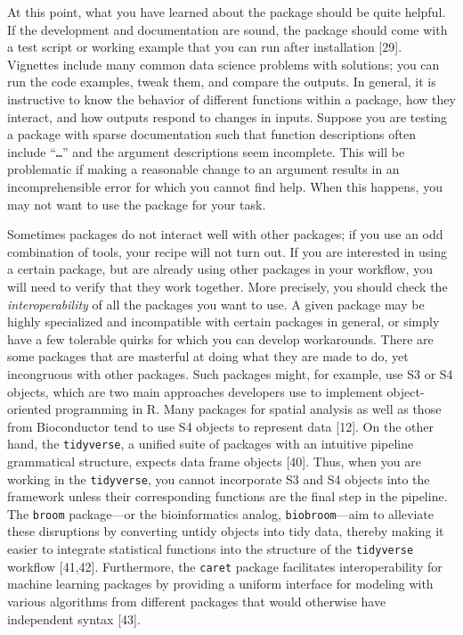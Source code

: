 \documentclass[10pt,letterpaper]{article}
\begin{document}
At this point, what you have learned about the package should be quite
helpful. If the development and documentation are sound, the package
should come with a test script or working example that you can run after
installation {[}29{]}. Vignettes include many common data science
problems with solutions; you can run the code examples, tweak them, and
compare the outputs. In general, it is instructive to know the behavior
of different functions within a package, how they interact, and how
outputs respond to changes in inputs. Suppose you are testing a package
with sparse documentation such that function descriptions often include
``\texttt{\ldots{}}'' and the argument descriptions seem incomplete.
This will be problematic if making a reasonable change to an argument
results in an incomprehensible error for which you cannot find help.
When this happens, you may not want to use the package for your task.

Sometimes packages do not interact well with other packages; if you use
an odd combination of tools, your recipe will not turn out. If you are
interested in using a certain package, but are already using other
packages in your workflow, you will need to verify that they work
together. More precisely, you should check the \emph{interoperability}
of all the packages you want to use. A given package may be highly
specialized and incompatible with certain packages in general, or simply
have a few tolerable quirks for which you can develop workarounds. There
are some packages that are masterful at doing what they are made to do,
yet incongruous with other packages. Such packages might, for example,
use S3 or S4 objects, which are two main approaches developers use to
implement object-oriented programming in R. Many packages for spatial
analysis as well as those from Bioconductor tend to use S4 objects to
represent data {[}12{]}. On the other hand, the \texttt{tidyverse}, a
unified suite of packages with an intuitive pipeline grammatical
structure, expects data frame objects {[}40{]}. Thus, when you are
working in the \texttt{tidyverse}, you cannot incorporate S3 and S4
objects into the framework unless their corresponding functions are the
final step in the pipeline. The \texttt{broom} package---or the
bioinformatics analog, \texttt{biobroom}---aim to alleviate these
disruptions by converting untidy objects into tidy data, thereby making
it easier to integrate statistical functions into the structure of the
\texttt{tidyverse} workflow {[}41,42{]}. Furthermore, the \texttt{caret}
package facilitates interoperability for machine learning packages by
providing a uniform interface for modeling with various algorithms from
different packages that would otherwise have independent syntax
{[}43{]}.
\end{document}
